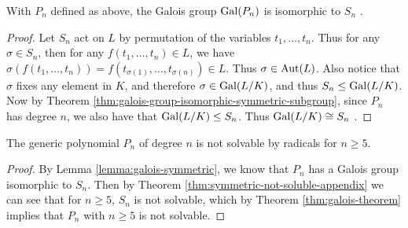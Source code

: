 \begin{lemma}\label{lemma:galois-symmetric}
	With $P_n$ defined as above, the Galois group $\operatorname{Gal}(P_n)$ is isomorphic to $S_n$ .
\end{lemma}

\begin{proof}
	
	Let $S_n$ act on $L$ by permutation of the variables $t_1,...,t_n$. Thus for any $\sigma \in S_n$, then for any $f(t_1,\dots,t_n) \in L $, we have 
	$   \sigma( f(t_1, \dots, t_n) )=f( t_{\sigma(1)},\dots,t_{\sigma(n)}) \in L. $
	Thus $\sigma \in \operatorname{Aut}(L)$.  Also notice that $\sigma$ fixes any element in $K$, and therefore
	 $\sigma \in \operatorname{Gal}(L/K)$, and thus $S_n \le \operatorname{Gal}(L/K)$.  Now by Theorem \ref{thm:galois-group-isomorphic-symmetric-subgroup}, since $P_n$ has degree $n$, we also have that $\operatorname{Gal}(L/K) \le S_n$. Thus $\operatorname{Gal}(L/K) \cong S_n$ . 
%	
\end{proof}


\begin{theorem}\label{thm:abel-ruffini-thm}
	The generic polynomial $P_n$ of degree $n$ is not solvable by radicals for $n \geq 5$. 
\end{theorem}

\begin{proof}
	By Lemma \ref{lemma:galois-symmetric}, we know that $P_n$ has a Galois group isomorphic to $S_n$. Then by Theorem \ref{thm:symmetric-not-soluble-appendix} we can see that for $n \geq 5$, $S_n$ is not solvable, which by Theorem \ref{thm:galois-theorem} implies that $P_n$ with $n \ge 5$ is not solvable.
\end{proof}



